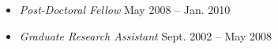 \begin{itemize}
%
\item[] \textit{Post-Doctoral Fellow}%
        \hfill May 2008 -- Jan. 2010
%
\item[] \textit{Graduate Research Assistant}%
        \hfill Sept. 2002 -- May 2008
%
\end{itemize}

